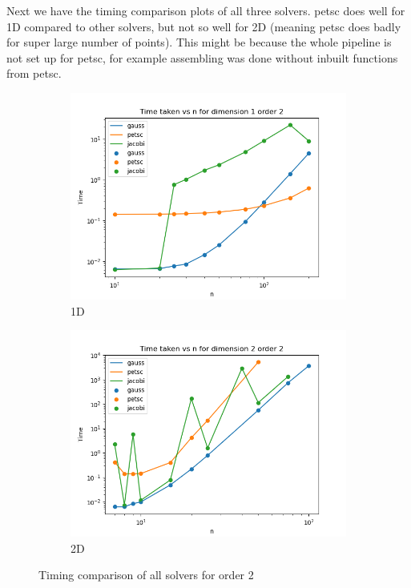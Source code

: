 \documentclass[12 pt, final]{article}
\begin{document}
\begin{itemize}
Next we have the timing comparison plots of all three solvers. petsc does well for 1D compared to other solvers, but not so well for 2D (meaning petsc does badly for super large number of points). This might be because the whole pipeline is not set up for petsc, for example assembling was done without inbuilt functions from petsc. 

       \begin{figure}[H]
        \centering
        \begin{subfigure}{.5\textwidth}
          \centering
          \includegraphics[width=.99\linewidth]{figures/time_all_solvers_order_2_dimension_1.png}
          \caption{1D}
          \label{fig:sub1}
        \end{subfigure}%
        \begin{subfigure}{.5\textwidth}
          \centering
          \includegraphics[width=.99\linewidth]{figures/time_all_solvers_order_2_dimension_2.png}
          \caption{2D}
          \label{fig:sub2}
        \end{subfigure}
        \caption{Timing comparison of all solvers for order 2}
        \label{fig:test}
        \end{figure}
        

\end{itemize}
\end{document}
